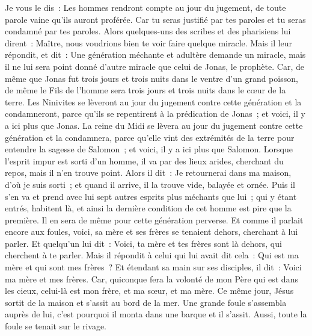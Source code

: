 \begin{multicols}{2}
Je vous le dis~: Les hommes rendront compte au jour du jugement, de toute parole vaine qu'ils auront proférée.
Car tu seras justifié par tes paroles et tu seras condamné par tes paroles.
Alors quelques-uns des scribes et des pharisiens lui dirent~: Maître, nous voudrions bien te voir faire quelque miracle.
Mais il leur répondit, et dit~: Une génération méchante et adultère demande un miracle, mais il ne lui sera point donné d'autre miracle que celui de Jonas, le prophète.
Car, de même que Jonas fut trois jours et trois nuits dans le ventre d'un grand poisson, de même le Fils de l'homme sera trois jours et trois nuits dans le cœur de la terre.
Les Ninivites se lèveront au jour du jugement contre cette génération et la condamneront, parce qu'ils se repentirent à la prédication de Jonas~; et voici, il y a ici plus que Jonas.
La reine du Midi se lèvera au jour du jugement contre cette génération et la condamnera, parce qu'elle vint des extrémités de la terre pour entendre la sagesse de Salomon~; et voici, il y a ici plus que Salomon.
Lorsque l'esprit impur est sorti d'un homme, il va par des lieux arides, cherchant du repos, mais il n'en trouve point.
Alors il dit~: Je retournerai dans ma maison, d'où je suis sorti~; et quand il arrive, il la trouve vide, balayée et ornée.
Puis il s'en va et prend avec lui sept autres esprits plus méchants que lui~; qui y étant entrés, habitent là, et ainsi la dernière condition de cet homme est pire que la première. Il en sera de même pour cette génération perverse.
Et comme il parlait encore aux foules, voici, sa mère et ses frères se tenaient dehors, cherchant à lui parler.
Et quelqu'un lui dit~: Voici, ta mère et tes frères sont là dehors, qui cherchent à te parler.
Mais il répondit à celui qui lui avait dit cela~: Qui est ma mère et qui sont mes frères~?
Et étendant sa main sur ses disciples, il dit~: Voici ma mère et mes frères.
Car, quiconque fera la volonté de mon Père qui est dans les cieux, celui-là est mon frère, et ma sœur, et ma mère.
\VerseOne{}Ce même jour, Jésus sortit de la maison et s'assit au bord de la mer.
Une grande foule s'assembla auprès de lui, c'est pourquoi il monta dans une barque et il s'assit. Aussi, toute la foule se tenait sur le rivage.

\end{multicols}
